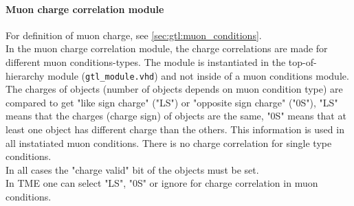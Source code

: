 \clearpage

\paragraph{Muon charge correlation module}\label{sec:gtl:muon_charge_correlation_module}

For definition of muon charge, see \ref{sec:gtl:muon_conditions}.\\
In the muon charge correlation module, the charge correlations are made for different muon conditions-types. The module is instantiated in the top-of-hierarchy module (\texttt{gtl\_module.vhd})
and not inside of a muon conditions module. 
The charges of objects (number of objects depends on muon condition type) are compared to get "like sign charge" ("LS") or "opposite sign charge" ("0S"), "LS" means that the charges (charge sign)
of objects are the same, "0S" means that at least one object has different charge than the others. This information is used in all instatiated muon conditions.
There is no charge correlation for single type conditions.\\
In all cases the "charge valid" bit of the objects must be set.\\
In TME one can select "LS", "0S" or ignore for charge correlation in muon conditions.\\

% 
% 
% 
% 
% 
% 

